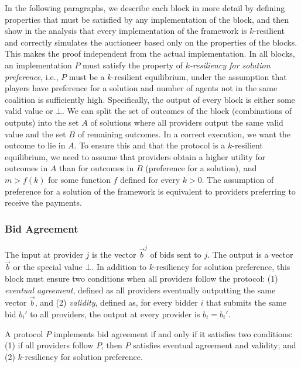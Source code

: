In the following paragraphs, we describe each block 
in more detail by defining properties that must be satisfied 
by any implementation of the block, and then show in the analysis that
every implementation of the framework is $k$-resilient and correctly simulates
the auctioneer based only on the properties of the blocks. This makes
the proof independent from the actual implementation.
In all blocks, an implementation $P$ must satisfy
the property of \emph{$k$-resiliency for solution preference}, i.e.,
$P$ must be a $k$-resilient equilibrium, under
the assumption that players have preference for a solution 
and number of agents not in the same coalition is sufficiently high.
Specifically, the output of every block is either some valid value or $\bot$.
We can split the set of outcomes of the block (combinations of outputs)
into the set $A$ of solutions where all providers output the same valid value
and the set $B$ of remaining outcomes. 
In a correct execution, we want the outcome to lie in $A$.
To ensure this and that the protocol is a $k$-resilient equilibrium,
we need to assume that providers obtain a higher utility for outcomes in $A$
than for outcomes in $B$ (preference for a solution), and $m > f(k)$ for
some function $f$ defined for every $k > 0$.
The assumption of preference for a solution of the framework
is equivalent to providers preferring to receive the payments.

\subsubsection*{Bid Agreement}
The input at provider $j$ is the vector $\vec{b}^j$ of bids sent to $j$.
The output is a vector $\vec{b}$ or the special value $\bot$.
In addition to $k$-resiliency for solution preference,
this block must ensure two conditions when all providers follow the protocol: 
(1) \emph{eventual agreement}, defined as
all providers eventually outputting the same vector $\vec{b}$,
and (2) \emph{validity}, defined as,
for every bidder $i$ that submits the same bid $b_i'$
to all providers, the output at every provider is $b_i = b_i'$.

\begin{property}
\label{prop:bid-agreement}
A protocol $P$ implements bid agreement if and only if it satisfies two conditions:
(1) if all providers follow $P$, then $P$ satisfies eventual agreement and validity;
and (2) $k$-resiliency for solution preference.
\end{property}

